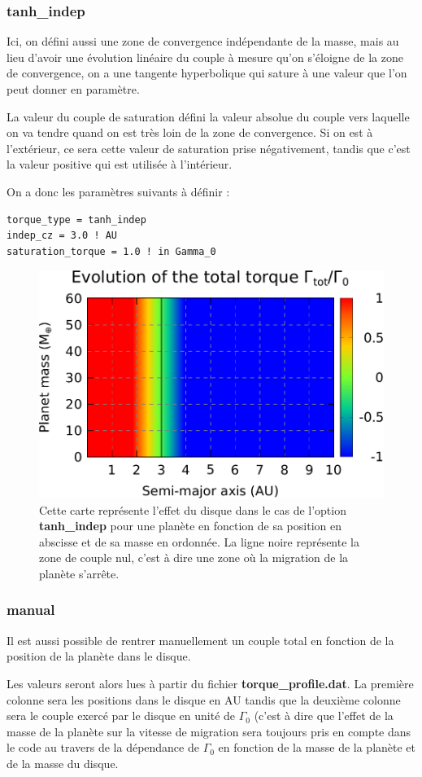 \subsubsection{tanh\_indep}\label{sec:tanh_indep}
Ici, on défini aussi une zone de convergence indépendante de la masse, mais au lieu d'avoir une évolution linéaire du couple à mesure qu'on s'éloigne de la zone de convergence, on a une tangente hyperbolique qui sature à une valeur que l'on peut donner en paramètre. 

La valeur du couple de saturation défini la valeur absolue du couple vers laquelle on va tendre quand on est très loin de la zone de convergence. Si on est à l'extérieur, ce sera cette valeur de saturation prise négativement, tandis que c'est la valeur positive qui est utilisée à l'intérieur.

On a donc les paramètres suivants à définir : 
\begin{verbatim}
torque_type = tanh_indep
indep_cz = 3.0 ! AU
saturation_torque = 1.0 ! in Gamma_0
\end{verbatim}

\begin{figure}[htb]
\centering
\includegraphics[width=0.65\linewidth]{figure/migration_map/tanh_indep.pdf}
\caption{Cette carte représente l'effet du disque dans le cas de l'option \textbf{tanh\_indep} pour une planète en fonction de sa position en abscisse et de sa masse en ordonnée. La ligne noire représente la zone de couple nul, c'est à dire une zone où la migration de la planète s'arrête.}
\end{figure}

\subsubsection{manual}
Il est aussi possible de rentrer manuellement un couple total en fonction de la position de la planète dans le disque. 

Les valeurs seront alors lues à partir du fichier \textbf{torque\_profile.dat}. La première colonne sera les positions dans le disque en AU tandis que la deuxième colonne sera le couple exercé par le disque en unité de $\Gamma_0$ (c'est à dire que l'effet de la masse de la planète sur la vitesse de migration sera toujours pris en compte dans le code au travers de la dépendance de $\Gamma_0$ en fonction de la masse de la planète et de la masse du disque.


